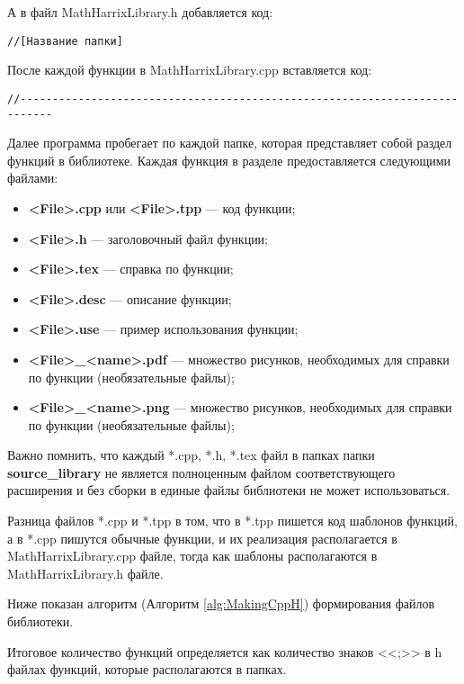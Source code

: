 \documentclass[a4paper,12pt]{article}
\begin{document}
А в файл MathHarrixLibrary.h добавляется код:

\begin{lstlisting}[label=make_sectionh,caption=Название раздела]
//[Название папки]
\end{lstlisting}

После каждой функции в MathHarrixLibrary.cpp вставляется код:
\begin{lstlisting}[label=make_sectionh,caption=Название раздела]
//---------------------------------------------------------------------------
\end{lstlisting}

Далее программа пробегает по каждой папке, которая представляет собой раздел функций в библиотеке. Каждая функция в разделе предоставляется следующими файлами:
\begin{itemize}
\item \textbf{<File>.cpp} или \textbf{<File>.tpp} --- код функции;
\item \textbf{<File>.h} --- заголовочный файл функции;
\item \textbf{<File>.tex} --- справка по функции;
\item \textbf{<File>.desc} --- описание функции;
\item \textbf{<File>.use} --- пример использования функции;
\item \textbf{<File>\_<name>.pdf} --- множество рисунков, необходимых для справки по функции (необязательные файлы);
\item \textbf{<File>\_<name>.png} --- множество рисунков, необходимых для справки по функции (необязательные файлы);
\end{itemize}

Важно помнить, что каждый *.cpp, *.h, *.tex файл в папках папки \textbf{source\_library} не является полноценным файлом соответствующего расширения и без сборки в единые файлы библиотеки не может использоваться.

Разница файлов *.cpp и *.tpp в том, что в *.tpp  пишется код шаблонов функций, а в *.cpp пишутся обычные функции, и их реализация располагается в MathHarrixLibrary.cpp файле, тогда как шаблоны располагаются в MathHarrixLibrary.h файле.

Ниже показан алгоритм (Алгоритм \ref{alg:MakingCppH}) формирования файлов библиотеки.

Итоговое количество функций определяется как количество знаков <<;>> в h файлах функций, которые располагаются в папках.
\end{document}
